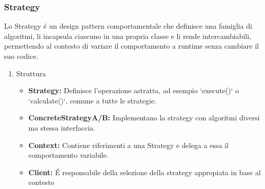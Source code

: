 \documentclass[11pt]{article}
\begin{document}
\subsubsection{Strategy}
\label{sec:org7df83e8}
Lo Strategy é un design pattern comportamentale che definisce una famiglia di algoritmi, li incapsula ciascuno in una propria classe e li rende intercambiabili, permettendo al contesto di variare il comportamento a runtime senza cambiare il suo codice.
\begin{enumerate}
\item Struttura
\label{sec:orgca33528}
\begin{itemize}
\item \textbf{\textbf{Strategy:}} Definisce l'operazione astratta, ad esempio `execute()` o `calculate()`, comune a tutte le strategie.
\item \textbf{\textbf{ConcreteStrategyA/B:}} Implementano la strategy con algoritmi diversi ma stessa interfaccia.
\item \textbf{\textbf{Context:}} Contiene riferimenti a una Strategy e delega a essa il comportamento variabile.
\item \textbf{\textbf{Client:}} É responsabile della selezione della strategy appropiata in base al contesto
\end{itemize}
\end{enumerate}
\end{document}
